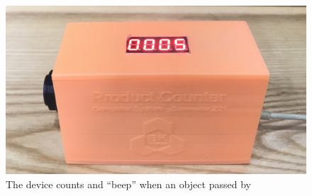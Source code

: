 \documentclass[a4paper,twoside]{report}
\begin{document}
\begin{figure}[H]
\includegraphics[scale=0.07]{images/counter_5.jpg}
\caption{The device counts and ``beep'' when an object passed by}
\end{figure}
\end{document}
